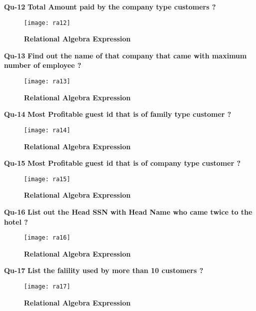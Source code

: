 \documentclass[a4,12pt]{report}
\begin{document}
\newpage
\textbf{Qu-12} \textbf{ Total Amount paid by the company type customers ? }\\

\begin{figure}[hbtp]
\centering
\texttt{[image: ra12]}
\caption{\textbf{{\color{red}Relational Algebra Expression}}}
\end{figure}

\textbf{Qu-13} \textbf{ Find out the name of that company that came with maximum number of employee ? }\\

\begin{figure}[hbtp]
\centering
\texttt{[image: ra13]}
\caption{\textbf{{\color{red}Relational Algebra Expression}}}
\end{figure}

\newpage
\textbf{Qu-14} \textbf{ Most Profitable guest id that is of family type customer ? }\\

\begin{figure}[hbtp]
\centering
\texttt{[image: ra14]}
\caption{\textbf{{\color{red}Relational Algebra Expression}}}
\end{figure}

\textbf{Qu-15} \textbf{ Most Profitable guest id that is of company type customer ? }\\

\begin{figure}[hbtp]
\centering
\texttt{[image: ra15]}
\caption{\textbf{{\color{red}Relational Algebra Expression}}}
\end{figure}

\newpage
\textbf{Qu-16} \textbf{ List out the Head SSN with Head Name who came twice to the hotel ? }\\

\begin{figure}[hbtp]
\centering
\texttt{[image: ra16]}
\caption{\textbf{{\color{red}Relational Algebra Expression}}}
\end{figure}

\textbf{Qu-17} \textbf{ List the falility used by more than 10 customers ? }\\

\begin{figure}[hbtp]
\centering
\texttt{[image: ra17]}
\caption{\textbf{{\color{red}Relational Algebra Expression}}}
\end{figure}
\end{document}
